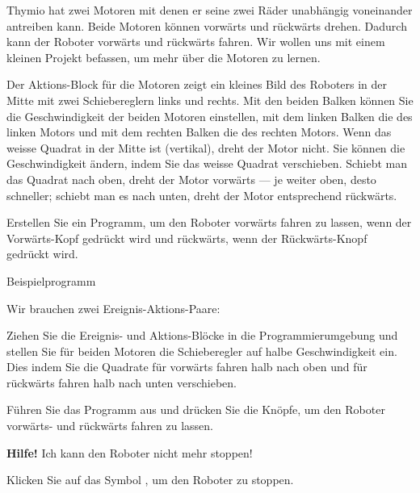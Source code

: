 \label{ch.moving}


Thymio hat zwei Motoren mit denen er seine zwei Räder unabhängig voneinander antreiben kann. Beide Motoren können vorwärts und rückwärts drehen. Dadurch kann der Roboter vorwärts und rückwärts fahren. Wir wollen uns mit einem kleinen Projekt befassen, um mehr über die Motoren zu lernen.

Der Aktions-Block für die Motoren  zeigt ein kleines Bild des Roboters in der Mitte mit zwei Schiebereglern links und rechts. Mit den beiden Balken können Sie die Geschwindigkeit der beiden Motoren einstellen, mit dem linken Balken die des linken Motors und mit dem rechten Balken die des rechten Motors. Wenn das weisse Quadrat in der Mitte ist (vertikal), dreht der Motor nicht.  Sie können die Geschwindigkeit ändern, indem Sie das weisse Quadrat verschieben. Schiebt man das Quadrat nach oben, dreht der Motor vorwärts --- je weiter oben, desto schneller; schiebt man es nach unten, dreht der Motor entsprechend rückwärts.

Erstellen Sie ein Programm, um den Roboter vorwärts fahren zu lassen, wenn der Vorwärts-Kopf gedrückt wird und rückwärts, wenn der Rückwärts-Knopf gedrückt wird.

{\raggedleft \hfill Beispielprogramm }

Wir brauchen zwei Ereignis-Aktions-Paare:

\begin{center}
\end{center}

Ziehen Sie die Ereignis- und Aktions-Blöcke in die Programmierumgebung und stellen Sie für beiden Motoren die Schieberegler auf halbe Geschwindigkeit ein. Dies indem Sie die Quadrate für vorwärts fahren halb nach oben und für rückwärts fahren halb nach unten verschieben.

Führen Sie das Programm aus und drücken Sie die Knöpfe, um den Roboter vorwärts- und rückwärts fahren zu lassen. 


\textbf{Hilfe!} Ich kann den Roboter nicht mehr stoppen!

Klicken Sie auf das Symbol , um den Roboter zu stoppen.

